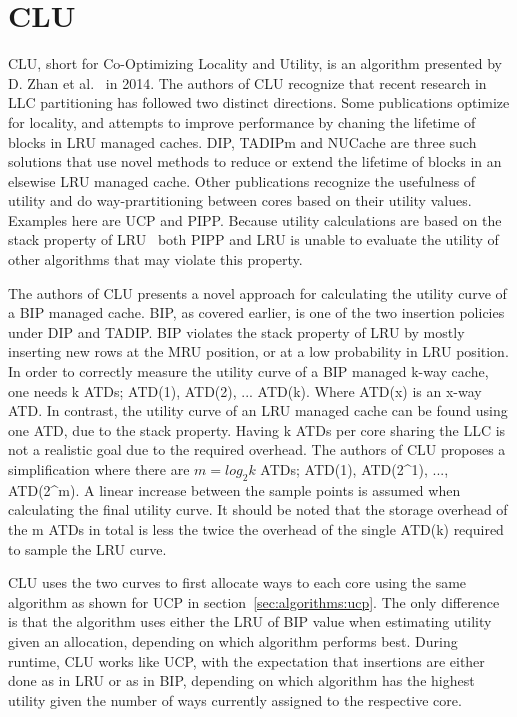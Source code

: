 
\section{CLU}
\label{sec:algorithms:clu}

CLU, short for Co-Optimizing Locality and Utility, is an algorithm presented by D. Zhan et al.~\cite{Zhan2014} in 2014.
The authors of CLU recognize that recent research in LLC partitioning has followed two distinct directions.
Some publications optimize for locality, and attempts to improve performance by chaning the lifetime of blocks in LRU managed caches.
DIP, TADIPm and NUCache are three such solutions that use novel methods to reduce or extend the lifetime of blocks in an elsewise LRU managed cache.
Other publications recognize the usefulness of utility and do way-prartitioning between cores based on their utility values.
Examples here are UCP and PIPP.
Because utility calculations are based on the stack property of LRU~\cite{Qureshi2006, Xie2009} both PIPP and LRU is unable to evaluate the utility of other algorithms that may violate this property.

The authors of CLU presents a novel approach for calculating the utility curve of a BIP managed cache.
BIP, as covered earlier, is one of the two insertion policies under DIP and TADIP. 
BIP violates the stack property of LRU by mostly inserting new rows at the MRU position, or at a low probability in LRU position.
In order to correctly measure the utility curve of a BIP managed k-way cache, one needs k ATDs; ATD(1), ATD(2), ... ATD(k). 
Where ATD(x) is an x-way ATD.
In contrast, the utility curve of an LRU managed cache can be found using one ATD, due to the stack property.
Having k ATDs per core sharing the LLC is not a realistic goal due to the required overhead.
The authors of CLU proposes a simplification where there are $m = log_2 k$ ATDs; ATD(1), ATD(2^1), ..., ATD(2^m).
A linear increase between the sample points is assumed when calculating the final utility curve.
It should be noted that the storage overhead of the m ATDs in total is less the twice the overhead of the single ATD(k) required to sample the LRU curve.

CLU uses the two curves to first allocate ways to each core using the same algorithm as shown for UCP in section~\ref{sec:algorithms:ucp}.
The only difference is that the algorithm uses either the LRU of BIP value when estimating utility given an allocation, depending on which algorithm performs best.
During runtime, CLU works like UCP, with the expectation that insertions are either done as in LRU or as in BIP, depending on which algorithm has the highest utility given the number of ways currently assigned to the respective core.
